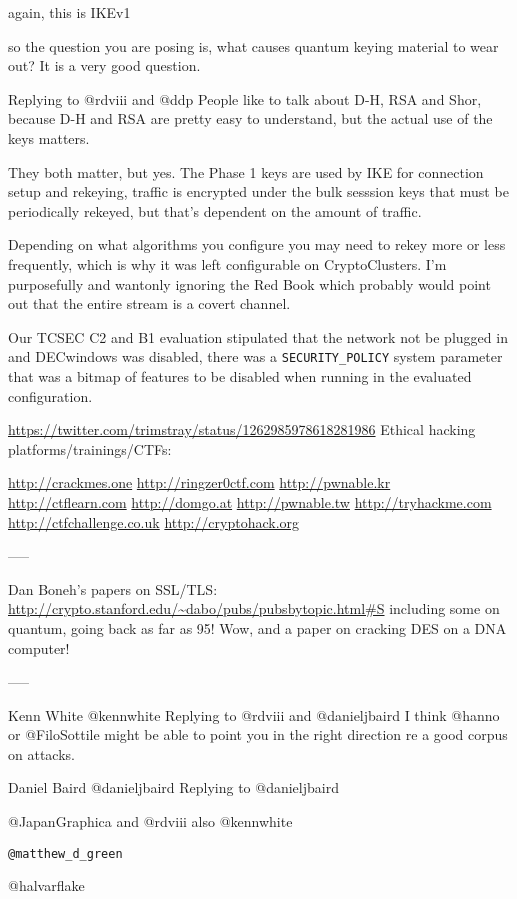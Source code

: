 \documentclass[%
 aip,
 jmp,%
 amsmath,amssymb,
 reprint,%
]{revtex4-1}
\begin{document}
again, this is IKEv1

so the question you are posing is, what causes quantum keying material
to wear out?  It is a very good question.

Replying to 
@rdviii
 and 
@ddp
People like to talk about D-H, RSA and Shor, because D-H and RSA are
pretty easy to understand, but the actual use of the keys matters.


They both matter, but yes.  The Phase 1 keys are used by IKE for
connection setup and rekeying, traffic is encrypted under the bulk
sesssion keys that must be periodically rekeyed, but that's dependent
on the amount of traffic.

Depending on what algorithms you configure you may need to rekey more or less frequently, which is why it was left configurable on CryptoClusters.  I'm purposefully and wantonly ignoring the Red Book which probably would point out that the entire stream is a covert channel.

Our TCSEC C2 and B1 evaluation stipulated that the network not be
plugged in and DECwindows was disabled, there was a \verb|SECURITY_POLICY|
system parameter that was a bitmap of features to be disabled when
running in the evaluated configuration.



\url{https://twitter.com/trimstray/status/1262985978618281986}
Ethical hacking platforms/trainings/CTFs:

\url{http://crackmes.one}
\url{http://ringzer0ctf.com}
\url{http://pwnable.kr}
\url{http://ctflearn.com}
\url{http://domgo.at}
\url{http://pwnable.tw}
\url{http://tryhackme.com}
\url{http://ctfchallenge.co.uk}
\url{http://cryptohack.org}

-----

Dan Boneh's papers on SSL/TLS:
\url{http://crypto.stanford.edu/~dabo/pubs/pubsbytopic.html#S}
including some on quantum, going back as far as 95!
Wow, and a paper on cracking DES on a DNA computer!

-----


Kenn White
@kennwhite
Replying to 
@rdviii
 and 
@danieljbaird
I think 
@hanno
 or 
@FiloSottile
 might be able to point you in the right direction re a good corpus on
 attacks.

Daniel Baird
@danieljbaird
Replying to 
@danieljbaird
 
@JapanGraphica
 and 
@rdviii
also 
@kennwhite
  
\verb|@matthew_d_green|
  
@halvarflake
\end{document}
